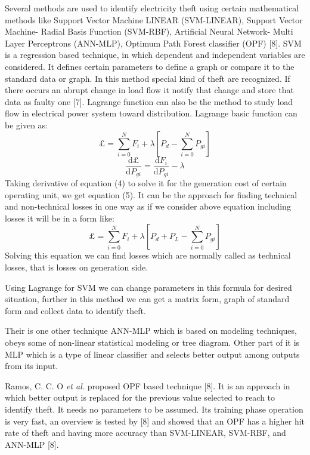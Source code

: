 \documentclass[10pt, conference, compsocconf]{IEEEtran}
\begin{document}
Several methods are used to identify electricity theft using certain mathematical methods like Support Vector Machine LINEAR (SVM-LINEAR), Support Vector Machine- Radial Basis Function (SVM-RBF), Artificial Neural Network- Multi Layer Perceptrons (ANN-MLP), Optimum Path Forest classifier (OPF) [8]. SVM is a regression based technique, in which dependent and independent variables are considered. It defines certain parameters to define a graph or compare it to the standard data or graph. In this method special kind of theft are recognized. If there occurs an abrupt change in load flow it notify that change and store that data as faulty one [7]. Lagrange function can also be the method to study load flow in electrical power system toward distribution. Lagrange basic function can be given as:
\begin{equation}
\pounds = \sum_{i=0}^{N}F_{i}+\lambda \left [ P_{d}-\sum_{i=0}^{N}P_{gi} \right ]
\end{equation}
\begin{equation}
\frac{\mathrm{d} \pounds}{\mathrm{d} P_{gi}}=\frac{\mathrm{d} F_i}{\mathrm{d} P_{gi}}-\lambda
\end{equation}
Taking derivative of equation (4) to solve it for the generation cost of certain operating unit, we get equation (5). It can be the approach for finding technical and non-technical losses in one way as if we consider above equation including losses it will be in a form like:
\begin{equation}
\pounds = \sum_{i=0}^{N}F_{i}+\lambda \left [ P_{d}+P_{L}-\sum_{i=0}^{N}P_{gi} \right ]
\end{equation}
Solving this equation we can find losses which are normally called as technical losses, that is losses on generation side.

Using Lagrange for SVM we can change parameters in this formula for desired situation, further in this method we can get a matrix form, graph of standard form and collect data to identify theft.

Their is one other technique ANN-MLP which is based on modeling techniques, obeys some of non-linear statistical modeling or tree diagram. Other part of it is MLP which is a type of linear classifier and selects better output among outputs from its input.

Ramos, C. C. O \textit {et al.} proposed OPF based technique [8]. It is an approach in which better output is replaced for the previous value selected to reach to identify theft. It needs no parameters to be assumed. Its training phase operation is very fast, an overview is tested by [8] and showed that an OPF has a higher hit rate of theft and having more accuracy than SVM-LINEAR, SVM-RBF, and ANN-MLP [8].
\end{document}
